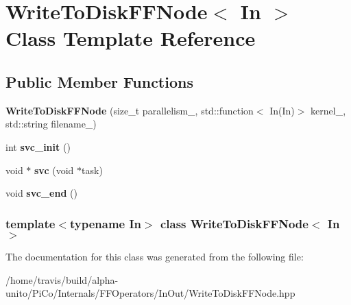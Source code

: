 \hypertarget{class_write_to_disk_f_f_node}{\section{\-Write\-To\-Disk\-F\-F\-Node$<$ \-In $>$ \-Class \-Template \-Reference}
\label{class_write_to_disk_f_f_node}
}
\subsection*{\-Public \-Member \-Functions}
\begin{DoxyCompactItemize}
\item 
\hypertarget{class_write_to_disk_f_f_node_ab08667ea7e0970d288acc0d7a68a92f1}{{\bfseries \-Write\-To\-Disk\-F\-F\-Node} (size\-\_\-t parallelism\-\_\-, std\-::function$<$ \-In(\-In)$>$ kernel\-\_\-, std\-::string filename\-\_\-)}\label{class_write_to_disk_f_f_node_ab08667ea7e0970d288acc0d7a68a92f1}

\item 
\hypertarget{class_write_to_disk_f_f_node_adbb0f820e3e4168e3881e57e6fffb047}{int {\bfseries svc\-\_\-init} ()}\label{class_write_to_disk_f_f_node_adbb0f820e3e4168e3881e57e6fffb047}

\item 
\hypertarget{class_write_to_disk_f_f_node_abfac53a07fd79196f8f84acc05f14122}{void $\ast$ {\bfseries svc} (void $\ast$task)}\label{class_write_to_disk_f_f_node_abfac53a07fd79196f8f84acc05f14122}

\item 
\hypertarget{class_write_to_disk_f_f_node_a6c3c04a03f899fd788ebd5895c1f42cc}{void {\bfseries svc\-\_\-end} ()}\label{class_write_to_disk_f_f_node_a6c3c04a03f899fd788ebd5895c1f42cc}

\end{DoxyCompactItemize}
\subsubsection*{template$<$typename \-In$>$ class Write\-To\-Disk\-F\-F\-Node$<$ In $>$}



\-The documentation for this class was generated from the following file\-:\begin{DoxyCompactItemize}
\item 
/home/travis/build/alpha-\/unito/\-Pi\-Co/\-Internals/\-F\-F\-Operators/\-In\-Out/\-Write\-To\-Disk\-F\-F\-Node.\-hpp\end{DoxyCompactItemize}

